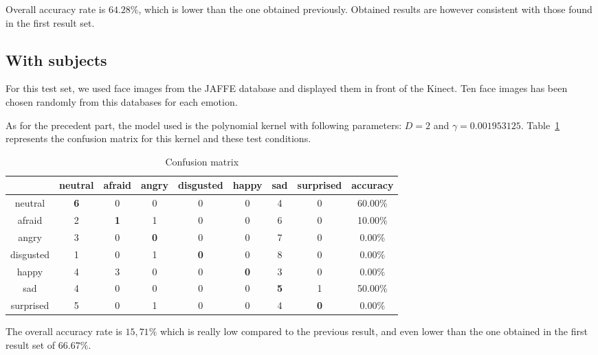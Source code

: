 \noindent Overall accuracy rate is $ 64.28\% $, which is lower than the one obtained previously. Obtained results are however consistent with those found in the first result set.
\newline

\subsection{With subjects}

\vspace{\baselineskip}
\noindent For this test set, we used face images from the JAFFE database and displayed them in front of the Kinect. Ten face images has been chosen randomly from this databases for each emotion.
\newline

\noindent As for the precedent part, the model used is the polynomial kernel with following parameters: $ D = 2 $ and $ \gamma = 0.001953125 $. Table~\ref{table_results_confusion_matrix_jaffe} represents the confusion matrix for this kernel and these test conditions.
\newline

\begin{table}[h]
\begin{center}
   \caption{\label{table_results_confusion_matrix_jaffe} Confusion matrix}
\begin{tabular}{|c|c|c|c|c|c|c|c|c|}
  \hline
   & neutral & afraid & angry & disgusted & happy & sad & surprised & accuracy \\
  \hline
  neutral & \textbf{6} & 0 & 0 & 0 & 0 & 4 & 0 & 60.00\% \\
  afraid & 2 & \textbf{1} & 1 & 0 & 0 & 6 & 0 & 10.00\% \\
  angry & 3 & 0 & \textbf{0} & 0 & 0 & 7 & 0 & 0.00\% \\
  disgusted & 1 & 0 & 1 & \textbf{0} & 0 & 8 & 0 & 0.00\% \\
  happy & 4 & 3 & 0 & 0 & \textbf{0} & 3 & 0 & 0.00\% \\
  sad & 4 & 0 & 0 & 0 & 0 & \textbf{5} & 1 & 50.00\% \\
  surprised & 5 & 0 & 1 & 0 & 0 & 4 & \textbf{0} & 0.00\%\\
  \hline
\end{tabular}
\end{center}
\end{table}

\noindent The overall accuracy rate is $ 15,71\% $ which is really low compared to the previous result, and even lower than the one obtained in the first result set of $ 66.67\% $. 
\newline

